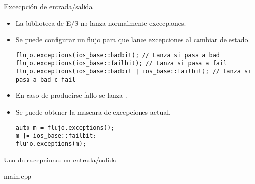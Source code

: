 \begin{frame}[fragile]{Excecpción de entrada/salida}
\begin{itemize}
  \item La biblioteca de E/S no lanza normalmente excecpiones.
  \item Se puede configurar un flujo para que lance excepciones al cambiar de estado.
\begin{lstlisting}
flujo.exceptions(ios_base::badbit); // Lanza si pasa a bad
flujo.exceptions(ios_base::failbit); // Lanza si pasa a fail
flujo.exceptions(ios_base::badbit | ios_base::failbit); // Lanza si pasa a bad o fail
\end{lstlisting}
  \item En caso de producirse fallo se lanza .
  \item Se puede obtener la máscara de excepciones actual.
\begin{lstlisting}
auto m = flujo.exceptions();
m |= ios_base::failbit;
flujo.exceptions(m);
\end{lstlisting}
\end{itemize}
\end{frame}

\begin{frame}{Uso de excepciones en entrada/salida}
\begin{block}{main.cpp}

\end{block}
\end{frame}
